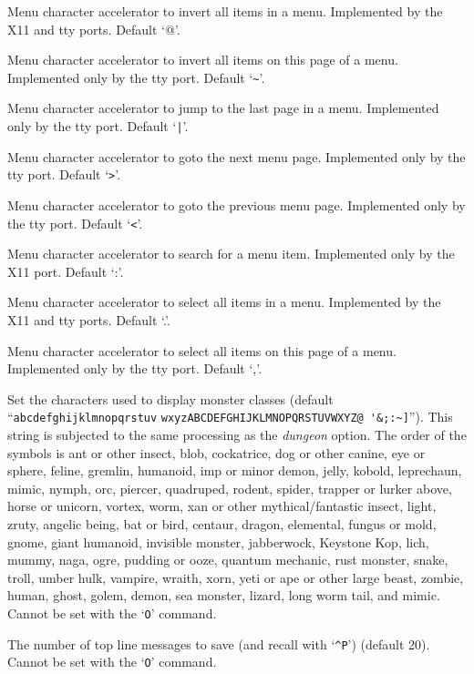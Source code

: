 Menu character accelerator to invert all items in a menu.
Implemented by the X11 and tty ports.
Default `@'.
\item[\ib{menu\_invert\_page}]
Menu character accelerator to invert all items on this page of a menu.
Implemented only by the tty port.
Default `\verb+~+'.
\item[\ib{menu\_last\_page}]
Menu character accelerator to jump to the last page in a menu.
Implemented only by the tty port.
Default `\verb+|+'.
\item[\ib{menu\_next\_page}]
Menu character accelerator to goto the next menu page.
Implemented only by the tty port.
Default `\verb+>+'.
\item[\ib{menu\_previous\_page}]
Menu character accelerator to goto the previous menu page.
Implemented only by the tty port.
Default `\verb+<+'.
\item[\ib{menu\_search}]
Menu character accelerator to search for a menu item.
Implemented only by the X11 port.
Default `:'.
\item[\ib{menu\_select\_all}]
Menu character accelerator to select all items in a menu.
Implemented by the X11 and tty ports.
Default `.'.
\item[\ib{menu\_select\_page}]
Menu character accelerator to select all items on this page of a menu.
Implemented only by the tty port.
Default `,'.
\item[\ib{monsters}]
Set the characters used to display monster classes (default
``\verb+abcdefghijklmnopqrstuv+
\verb+wxyzABCDEFGHIJKLMNOPQRSTUVWXYZ@ '&;:~]+'').
This string is subjected to the same processing as the {\it dungeon\/} option.
The order of the symbols is
ant or other insect, blob, cockatrice,
dog or other canine, eye or sphere, feline,
gremlin, humanoid, imp or minor demon,
jelly, kobold, leprechaun,
mimic, nymph, orc,
piercer, quadruped, rodent,
spider, trapper or lurker above, horse or unicorn,
vortex, worm, xan or other mythical/fantastic insect,
light, zruty,
angelic being, bat or bird, centaur,
dragon, elemental, fungus or mold,
gnome, giant humanoid, invisible monster,
jabberwock, Keystone Kop, lich,
mummy, naga, ogre,
pudding or ooze, quantum mechanic, rust monster,
snake, troll, umber hulk,
vampire, wraith, xorn,
yeti or ape or other large beast, zombie,
human, ghost, golem,
demon, sea monster, lizard,
long worm tail, and mimic.
Cannot be set with the `{\tt O}' command.
\item[\ib{msghistory}]
The number of top line messages to save (and recall with `{\tt \^{}P}')
(default 20). Cannot be set with the `{\tt O}' command.
